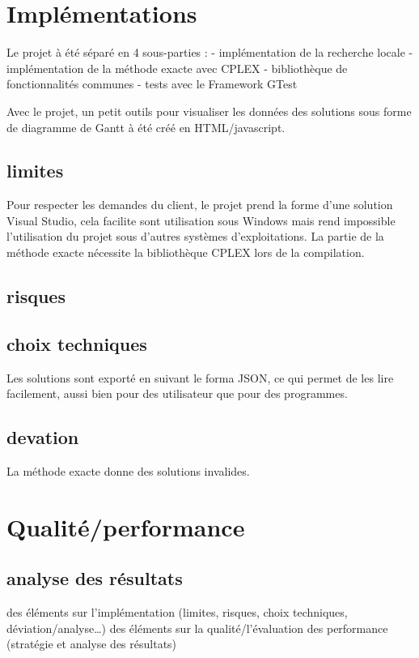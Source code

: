 \section{Implémentations}

Le projet à été séparé en 4 sous-parties :
- implémentation de la recherche locale
- implémentation de la méthode exacte avec CPLEX
- bibliothèque de fonctionnalités communes
- tests avec le Framework GTest

Avec le projet, un petit outils pour visualiser les données des solutions sous forme de diagramme de Gantt à été créé en HTML/javascript.

\subsection{limites}

Pour respecter les demandes du client, le projet prend la forme d'une solution Visual Studio,
cela facilite sont utilisation sous Windows mais rend impossible l'utilisation du projet sous d'autres systèmes d'exploitations.
La partie de la méthode exacte nécessite la bibliothèque CPLEX lors de la compilation.

\subsection{risques}

\subsection{choix techniques}
Les solutions sont exporté en suivant le forma JSON, 
ce qui permet de les lire facilement, 
aussi bien pour des utilisateur que pour des programmes.

\subsection{devation}
La méthode exacte donne des solutions invalides.

\section{Qualité/performance}

\subsection{analyse des résultats}

des éléments sur l'implémentation (limites, risques, choix techniques, déviation/analyse…) 
des éléments sur la qualité/l'évaluation des performance (stratégie et analyse des résultats)

